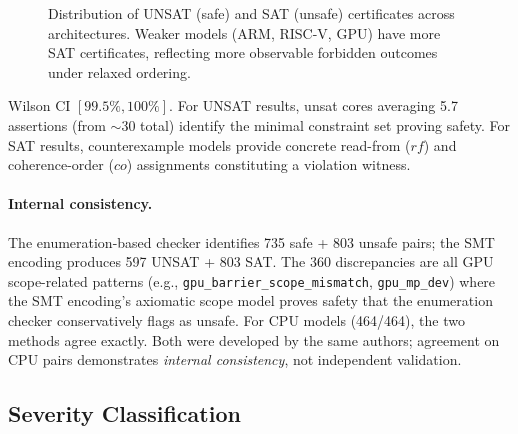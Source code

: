 \documentclass[11pt]{article}
\begin{document}
\begin{figure}[ht]
\centering
{}
\caption{Distribution of UNSAT (safe) and SAT (unsafe) certificates across
architectures. Weaker models (ARM, RISC-V, GPU) have more SAT certificates,
reflecting more observable forbidden outcomes under relaxed ordering.}
\label{fig:cert-distribution}
\end{figure}

\noindent
Wilson CI $[99.5\%, 100\%]$. For UNSAT results, unsat cores
averaging 5.7 assertions (from $\sim$30 total) identify the
minimal constraint set proving safety.  For SAT results,
counterexample models provide concrete read-from ($\mathit{rf}$) and
coherence-order ($\mathit{co}$) assignments constituting a
violation witness.

\paragraph{Internal consistency.} The enumeration-based checker
identifies 735 safe + 803 unsafe pairs; the SMT encoding produces
597 UNSAT + 803 SAT. The 360 discrepancies are all GPU
scope-related patterns (e.g., \texttt{gpu\_barrier\_scope\_mismatch},
\texttt{gpu\_mp\_dev}) where the SMT encoding's axiomatic scope model
proves safety that the enumeration checker conservatively flags as unsafe.
For CPU models (464/464), the two methods agree exactly.
Both were developed by the same authors; agreement on CPU pairs
demonstrates \emph{internal consistency}, not independent validation.

\subsection{Severity Classification}
\label{sec:severity}
\end{document}
